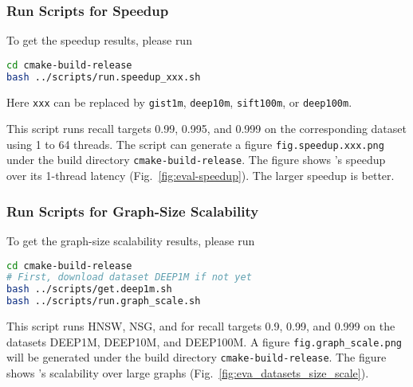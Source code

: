 \subsubsection{Run Scripts for Speedup}
To get the speedup results, please run
\begin{lstlisting}[language=bash]
cd cmake-build-release
bash ../scripts/run.speedup_xxx.sh
\end{lstlisting}
Here \verb|xxx| can be replaced by \verb|gist1m|, \verb|deep10m|, \verb|sift100m|, or \verb|deep100m|.

This script runs \Hammer recall targets 0.99, 0.995, and 0.999 on the corresponding dataset using 1 to 64 threads. 
The script can generate a figure \verb|fig.speedup.xxx.png| under the build directory \verb|cmake-build-release|. The figure shows \Hammer's speedup over its 1-thread latency (Fig.~\ref{fig:eval-speedup}). The larger speedup is better.

\subsubsection{Run Scripts for Graph-Size Scalability}
To get the graph-size scalability results, please run
\begin{lstlisting}[language=bash]
cd cmake-build-release
# First, download dataset DEEP1M if not yet
bash ../scripts/get.deep1m.sh 
bash ../scripts/run.graph_scale.sh
\end{lstlisting}

This script runs HNSW, NSG, and \Hammer for recall targets 0.9, 0.99, and 0.999 on the datasets DEEP1M, DEEP10M, and DEEP100M. 
A figure \verb|fig.graph_scale.png| will be generated under the build directory \verb|cmake-build-release|. The figure shows \Hammer's scalability over large graphs (Fig.~\ref{fig:eva_datasets_size_scale}). 




